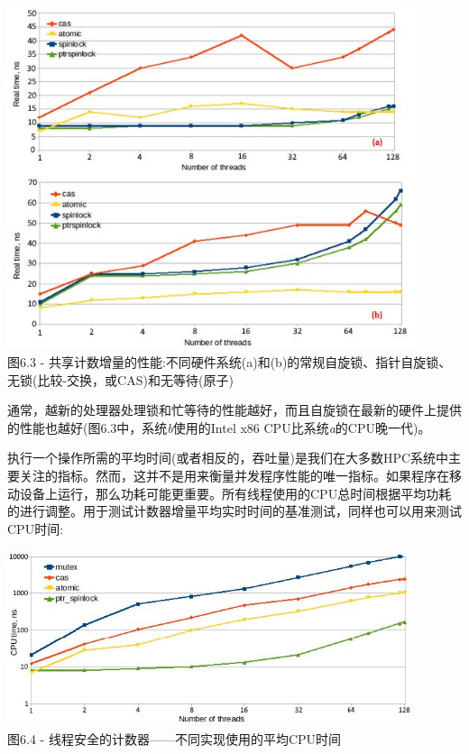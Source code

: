 \begin{center}
\includegraphics[width=0.9\textwidth]{content/2/chapter6/images/3.jpg}\\
图6.3 - 共享计数增量的性能:不同硬件系统(a)和(b)的常规自旋锁、指针自旋锁、无锁(比较-交换，或CAS)和无等待(原子)
\end{center}

通常，越新的处理器处理锁和忙等待的性能越好，而且自旋锁在最新的硬件上提供的性能也越好(图6.3中，系统\textit{b}使用的Intel x86 CPU比系统\textit{a}的CPU晚一代)。

执行一个操作所需的平均时间(或者相反的，吞吐量)是我们在大多数HPC系统中主要关注的指标。然而，这并不是用来衡量并发程序性能的唯一指标。如果程序在移动设备上运行，那么功耗可能更重要。所有线程使用的CPU总时间根据平均功耗的进行调整。用于测试计数器增量平均实时时间的基准测试，同样也可以用来测试CPU时间:

\begin{center}
\includegraphics[width=0.9\textwidth]{content/2/chapter6/images/4.jpg}\\
图6.4 - 线程安全的计数器——不同实现使用的平均CPU时间
\end{center}

